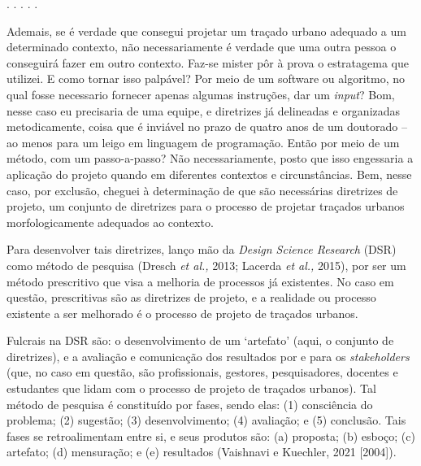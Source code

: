 \documentclass[12pt, a4paper]{book} %
\begin{document}
        \begin{center}
        . . . . .
        \end{center}

        Ademais, se é verdade que consegui projetar um traçado urbano adequado a um determinado contexto, não necessariamente é verdade que uma outra pessoa o conseguirá fazer em outro contexto. Faz-se mister pôr à prova o estratagema que utilizei. E como tornar isso palpável? Por meio de um software ou algoritmo, no qual fosse necessario fornecer apenas algumas instruções, dar um \textit{input}? Bom, nesse caso eu precisaria de uma equipe, e diretrizes já delineadas e organizadas metodicamente, coisa que é inviável no prazo de quatro anos de um doutorado – ao menos para um leigo em linguagem de programação. Então por meio de um método, com um passo-a-passo? Não necessariamente, posto que isso engessaria a aplicação do projeto quando em diferentes contextos e circunstâncias. Bem, nesse caso, por exclusão, cheguei à determinação de que são necessárias diretrizes de projeto, um conjunto de diretrizes para o processo de projetar traçados urbanos morfologicamente adequados ao contexto. 

        Para desenvolver tais diretrizes, lanço mão da \textit{Design Science Research} (DSR) como método de pesquisa (Dresch \textit{et al.,} 2013; Lacerda \textit{et al.,} 2015), por ser um método prescritivo que visa a melhoria de processos já existentes. No caso em questão, prescritivas são as diretrizes de projeto, e a realidade ou processo existente a ser melhorado é o processo de projeto de traçados urbanos.

        Fulcrais na DSR são: o desenvolvimento de um `artefato' (aqui, o conjunto de diretrizes), e a avaliação e comunicação dos resultados por e para os \textit{stakeholders} (que, no caso em questão, são profissionais, gestores, pesquisadores, docentes e estudantes que lidam com o processo de projeto de traçados urbanos). Tal método de pesquisa é constituído por fases, sendo elas: (1) consciência do problema; (2) sugestão; (3) desenvolvimento; (4) avaliação; e (5) conclusão. Tais fases se retroalimentam entre si, e seus produtos são: (a) proposta; (b) esboço; (c) artefato; (d) mensuração; e (e) resultados (Vaishnavi e Kuechler, 2021 [2004]).
\end{document}
